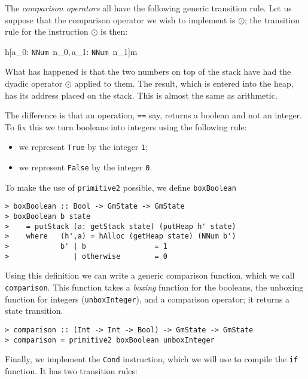 The {\em comparison operators\/} all have
the following generic transition rule.  Let us suppose that the
comparison operator we wish to implement is $\odot$; the transition
rule for the instruction $\odot$ is then:

\gmruled%
{%
{h[a_0: \mbox{\tt NNum}\ n_0,\,a_1: \mbox{\tt NNum}\ n_1]}{m}}%
{}

What has happened is that the two numbers on top of the stack have had
the dyadic operator $\odot$ applied to them. The result, which is
entered into the heap, has its address placed on the stack.
This is almost the same as arithmetic.

The difference is that an operation, \mbox{\tt ==} say, returns a boolean and
not an integer. To fix this we turn booleans into integers using the
following rule:

\begin{itemize}
\item we represent \mbox{\tt True} by the integer \mbox{\tt 1};
\item we represent \mbox{\tt False} by the integer \mbox{\tt 0}.
\end{itemize}

To make the use of \mbox{\tt primitive2} possible, we define \mbox{\tt boxBoolean}
\begin{verbatim}
> boxBoolean :: Bool -> GmState -> GmState
> boxBoolean b state
>    = putStack (a: getStack state) (putHeap h' state)
>    where   (h',a) = hAlloc (getHeap state) (NNum b')
>            b' | b                = 1
>               | otherwise        = 0
\end{verbatim}
%
%
Using this definition we can write a generic comparison function,
which we call \mbox{\tt comparison}. This function takes a {\em
boxing} function for the booleans, the unboxing
function for integers (\mbox{\tt unboxInteger}), and a comparison operator; it
returns a state transition.
\begin{verbatim}
> comparison :: (Int -> Int -> Bool) -> GmState -> GmState
> comparison = primitive2 boxBoolean unboxInteger
\end{verbatim}
%
%
\par
Finally, we implement the \mbox{\tt Cond} instruction, which we will use to
compile the \mbox{\tt if} function. It has two transition rules:

